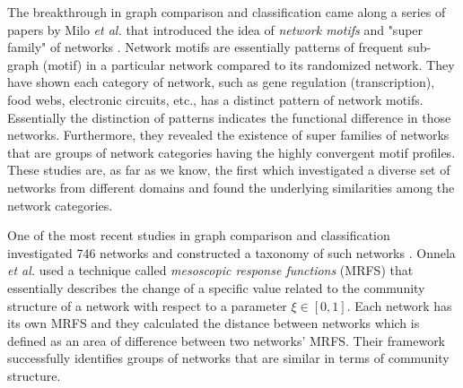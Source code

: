 \documentclass{article}
\begin{document}
	The breakthrough in graph comparison and classification came along a series of papers by Milo \textit{et al.} that introduced the idea of \textit{network motifs} and "super family" of networks \cite{Milo_motif, Milo_SuperFamily}. Network motifs are essentially patterns of frequent sub-graph (motif) in a particular network compared to its randomized network\cite{Milo_motif}. They have shown each category of network, such as gene regulation (transcription), food webs, electronic circuits, etc., has a distinct pattern of network motifs. Essentially the distinction of patterns indicates the functional difference in those networks. Furthermore, they revealed the existence of super families of networks that are groups of network categories having the highly convergent motif profiles. These studies are, as far as we know, the first which investigated a diverse set of networks from different domains and found the underlying similarities among the network categories.
	
	One of the most recent studies in graph comparison and classification investigated 746 networks and constructed a taxonomy of such networks \cite{Onnela_Taxonomy}.  Onnela \textit{et al.} used a technique called \textit{mesoscopic response functions} (MRFS) that essentially describes the change of a specific value related to the community structure of a network with respect to a parameter $\xi \in [0,1]$. Each network has its own MRFS and they calculated the distance between networks which is defined as an area of difference between two networks' MRFS. Their framework successfully identifies groups of networks that are similar in terms of community structure.

	
\end{document}
